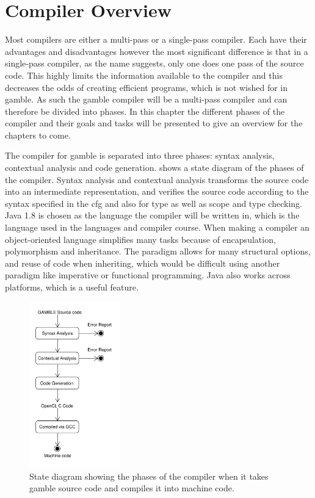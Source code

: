 \chapter{Compiler Overview}\label{Chp:CompilerOverview}
Most compilers are either a multi-pass or a single-pass compiler. 
Each have their advantages and disadvantages however the most significant difference is that in a single-pass compiler, as the name suggests, only one does one pass of the source code. 
This highly limits the information available to the compiler and this decreases the odds of creating efficient programs, which is not wished for in \gls{gamble}. 
As such the \gls{gamble} compiler will be a multi-pass compiler and can therefore be divided into phases.
In this chapter the different phases of the compiler and their goals and tasks will be presented to give an overview for the chapters to come.

The compiler for \gls{gamble} is separated into three phases: syntax analysis, contextual analysis and code generation.
 shows a state diagram of the phases of the compiler.
Syntax analysis and contextual analysis transforms the source code into an intermediate representation, and verifies the source code according to the syntax specified in the \acrshort{cfg} and also for type as well as scope and type checking.
Java 1.8 is chosen as the language the compiler will be written in, which is the language used in the languages and compiler course.
When making a compiler an object-oriented language simplifies many tasks because of encapsulation, polymorphism and inheritance. 
The paradigm allows for many structural options, and reuse of code when inheriting, which would be difficult using another paradigm like imperative or functional programming.
Java also works across platforms, which is a useful feature.

\begin{figure}[ht]
\centering
\includegraphics[width=0.35\textwidth]{figures/ClassDiagrams/CompilerDiagram.pdf}
\caption{State diagram showing the phases of the compiler when it takes \gls{gamble} source code and compiles it into machine code.}\label{fig:phases}
\end{figure}

